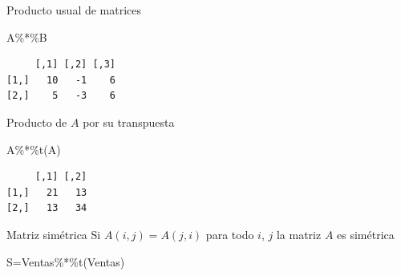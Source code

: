\documentclass[
  ignorenonframetext,
  aspectratio=169,
  spanish,
]{beamer}
\newenvironment{Shaded}{\begin{snugshade}}{\end{snugshade}}
\newcommand{\FunctionTok}[1]{\textcolor[rgb]{0.28,0.35,0.67}{#1}}
\newcommand{\NormalTok}[1]{\textcolor[rgb]{0.00,0.23,0.31}{#1}}
\newcommand{\OtherTok}[1]{\textcolor[rgb]{0.00,0.23,0.31}{#1}}
\newcommand{\SpecialCharTok}[1]{\textcolor[rgb]{0.37,0.37,0.37}{#1}}
\begin{document}
\begin{frame}[fragile]{Producto usual de matrices}
\label{producto-usual-de-matrices-1}
\begin{Shaded}
\begin{Highlighting}[]
\NormalTok{A}\SpecialCharTok{\%*\%}\NormalTok{B }
\end{Highlighting}
\end{Shaded}

\begin{verbatim}
     [,1] [,2] [,3]
[1,]   10   -1    6
[2,]    5   -3    6
\end{verbatim}
\end{frame}

\begin{frame}[fragile]{Producto de \(A\) por su transpuesta}
\label{producto-de-a-por-su-transpuesta}
\begin{Shaded}
\begin{Highlighting}[]
\NormalTok{A}\SpecialCharTok{\%*\%}\FunctionTok{t}\NormalTok{(A)}
\end{Highlighting}
\end{Shaded}

\begin{verbatim}
     [,1] [,2]
[1,]   21   13
[2,]   13   34
\end{verbatim}
\end{frame}

\begin{frame}[fragile]{Matriz simétrica}
\label{matriz-simuxe9trica}
Si \(A(i,j)=A(j,i)\) para todo \(i\), \(j\) la matriz \(A\) es simétrica

\begin{Shaded}
\begin{Highlighting}[]
\NormalTok{S}\OtherTok{=}\NormalTok{Ventas}\SpecialCharTok{\%*\%}\FunctionTok{t}\NormalTok{(Ventas)}
\end{Highlighting}
\end{Shaded}
\end{frame}
\end{document}
